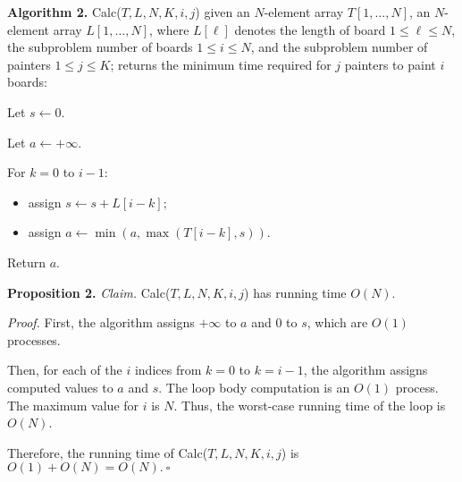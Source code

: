\begin{enumerate}
\begin{solution}
\textbf{Algorithm 2. }{\sc Calc}($T,L,N,K,i,j$) given an $N$-element array $T[1,\dots,N]$, an $N$-element array $L[1,\dots,N]$, where $L[\ell]$ denotes the length of board $1\leq\ell\leq N$, the subproblem number of boards $1\leq i\leq N$, and the subproblem number of painters $1\leq j\leq K$; returns the minimum time required for $j$ painters to paint $i$ boards:

Let $s\leftarrow 0$.

Let $a\leftarrow+\infty$.

For $k=0$ to $i-1$:
\begin{itemize}
\item assign $s\leftarrow s+L[i-k]$;
\item assign $a\leftarrow\min(a,\max(T[i-k],s))$.
\end{itemize}
Return $a$.

\textbf{Proposition 2. }\textit{Claim. }{\sc Calc}($T,L,N,K,i,j$) has running time $O(N)$.

\textit{Proof. }First, the algorithm assigns $+\infty$ to $a$ and $0$ to $s$, which are $O(1)$ processes.

Then, for each of the $i$ indices from $k=0$ to $k=i-1$, the algorithm assigns computed values to $a$ and $s$. The loop body computation is an $O(1)$ process. The maximum value for $i$ is $N$. Thus, the worst-case running time of the loop is $O(N)$.

Therefore, the running time of {\sc Calc}($T,L,N,K,i,j$) is $O(1)+O(N)=O(N).~\square$
\end{solution}
\end{enumerate}